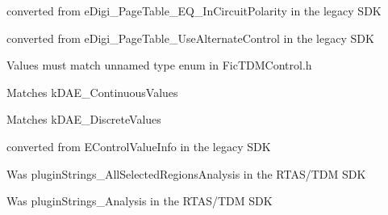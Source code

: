 \begin{DoxyRefList}
%
 converted from {\ttfamily e\+Digi\+\_\+\+Page\+Table\+\_\+\+E\+Q\+\_\+\+In\+Circuit\+Polarity} in the legacy S\+DK 
\item[Member \mbox{\hyperlink{a00491_aa169208a2ce713fa021e20deb2eaf608a1a0d975a333d3aee81b22f878697e9c4}{A\+A\+X\+\_\+e\+Page\+Table\+\_\+\+Use\+Alternate\+Control}} ]\label{a00787__porting_notes000026}%
%
 converted from {\ttfamily e\+Digi\+\_\+\+Page\+Table\+\_\+\+Use\+Alternate\+Control} in the legacy S\+DK 
\item[Member \mbox{\hyperlink{a00491_a193b89c4e2c5b57f2c4d7d5b5782fe87}{A\+A\+X\+\_\+\+E\+Parameter\+Type}} ]\label{a00787__porting_notes000010}%
%
 Values must match unnamed type enum in Fic\+T\+D\+M\+Control.\+h 
\item[Member \mbox{\hyperlink{a00491_a4cd0f189daa9a60cf36883c56344bb2eade82e7d1b5012a76837b70c1a9b92168}{A\+A\+X\+\_\+e\+Parameter\+Type\+\_\+\+Continuous}} ]\label{a00787__porting_notes000023}%
%
 Matches {\ttfamily k\+D\+A\+E\+\_\+\+Continuous\+Values}  
\item[Member \mbox{\hyperlink{a00491_a4cd0f189daa9a60cf36883c56344bb2ea2a3c9939ef1fa8b8f729152c35c42740}{A\+A\+X\+\_\+e\+Parameter\+Type\+\_\+\+Discrete}} ]\label{a00787__porting_notes000022}%
%
 Matches {\ttfamily k\+D\+A\+E\+\_\+\+Discrete\+Values}  
\item[Member \mbox{\hyperlink{a00491_aa169208a2ce713fa021e20deb2eaf608}{A\+A\+X\+\_\+\+E\+Parameter\+Value\+Info\+Selector}} ]\label{a00787__porting_notes000011}%
%
 converted from {\ttfamily E\+Control\+Value\+Info} in the legacy S\+DK  
\item[Member \mbox{\hyperlink{a00491_a86f7310877399d9d4d2ea4863d472476a18ce96adcc5420f19c7247bde5718490}{A\+A\+X\+\_\+e\+Plug\+In\+Strings\+\_\+\+All\+Selected\+Regions\+Analysis}} ]\label{a00787__porting_notes000016}%
%
 Was plugin\+Strings\+\_\+\+All\+Selected\+Regions\+Analysis in the R\+T\+A\+S/\+T\+DM S\+DK  
\item[Member \mbox{\hyperlink{a00491_a86f7310877399d9d4d2ea4863d472476a452cb68d82f40ff3464752eed92543ed}{A\+A\+X\+\_\+e\+Plug\+In\+Strings\+\_\+\+Analysis}} ]\label{a00787__porting_notes000012}%
%
 Was plugin\+Strings\+\_\+\+Analysis in the R\+T\+A\+S/\+T\+DM S\+DK  
\item[Member \mbox{\hyperlink{a00491_a86f7310877399d9d4d2ea4863d472476a9b49eb0306daf949d9bf4a5d4b22ada0}{A\+A\+X\+\_\+e\+Plug\+In\+Strings\+\_\+\+Bypass}} ]\label{a00787__porting_notes000020}%

\end{DoxyRefList}
